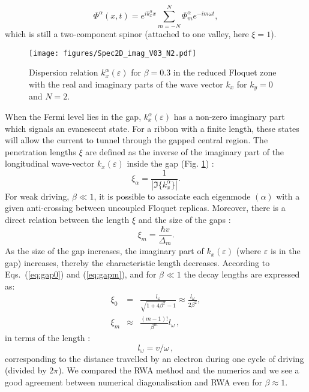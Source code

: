 \documentclass[aps,prb,showpacs,superscriptaddress,twocolumn,10pt,floatfix]{revtex4-1}
\newcommand{\ep}{\varepsilon}
\begin{document}
\begin{equation}
\Phi^{\alpha}(x,t) = e^{i k_x^{\alpha} x} \sum_{m=-N}^N  \Phi^{\alpha}_m    e^{- i m\omega t} , 
\end{equation}
which is still a two-component spinor (attached to one valley, here $\xi=1$).
\begin{figure}
\texttt{[image: figures/Spec2D\_imag\_V03\_N2.pdf]}
\caption{Dispersion relation $k_x^\alpha(\ep)$ for $\beta=0.3$ in the reduced Floquet zone with the real and imaginary parts of the wave vector $k_x$ for $k_y=0$ and $N=2$.}
\label{fig:spec_imag}
\end{figure} 

When the Fermi level lies in the gap, $k_x^\alpha(\ep)$ has a non-zero imaginary part which signals an evanescent state. For a ribbon with a finite length, these states will allow the current to tunnel through the gapped central region. The penetration lengths $\xi$ are defined as the inverse of the imaginary part of the longitudinal wave-vector $k_x(\ep)$ inside the gap (Fig. \ref{fig:spec_imag}) :
\begin{equation}
\xi_\alpha=\frac{1}{|\Im\{ k_x^{\alpha}\}|}.
\end{equation}
For weak driving, $\beta\ll1$, it is possible to associate each eigenmode $(\alpha)$ with a given anti-crossing between uncoupled Floquet replicas. Moreover, there is a direct relation between the length $\xi$ and the size of the gaps :
\begin{equation}
\xi_m=\frac{\hbar v}{\Delta_m}.
\end{equation}
As the size of the gap increases, the imaginary part of $k_x(\ep)$ (where $\ep$ is in the gap) increases, thereby the characteristic length decreases. According to Eqs.~(\ref{eq:gap0}) and (\ref{eq:gapm}), and for $\beta \ll 1 $ the decay lengths are expressed as:
\begin{eqnarray}
\xi_0&=&\frac{l_\omega}{\sqrt{1+4\beta^2}-1}\approx\frac{l_\omega}{2\beta^2},
\label{eq:length_evan1}\\
\xi_m&\approx & \frac{(m-1)!}{\beta^m}  l_\omega \, , 
\label{eq:length_evan2}
 \end{eqnarray}
in terms of the length :
\begin{equation}
l_\omega=v/\omega\, ,
\end{equation}
corresponding to the distance travelled by an electron during one cycle of driving (divided by $2 \pi$). We compared the RWA method and the numerics and we see a good agreement between numerical diagonalisation and RWA even for $\beta\approx 1$.
\end{document}
